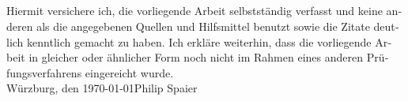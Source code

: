 \newpage
\begin{otherlanguage}{ngerman}
\thispagestyle{empty}
\section*{}
\thispagestyle{empty}
Hiermit versichere ich, die vorliegende Arbeit selbstständig verfasst und keine anderen als die angegebenen Quellen und Hilfsmittel benutzt sowie die Zitate deutlich kenntlich gemacht zu haben.
\newline
Ich erkläre weiterhin, dass die vorliegende Arbeit in gleicher oder ähnlicher Form noch nicht im Rahmen eines
anderen Prüfungsverfahrens eingereicht wurde.
\vspace{4\baselineskip}\\
Würzburg, den \today \hfill Philip Spaier
\vspace{4\baselineskip}\\
\end{otherlanguage}